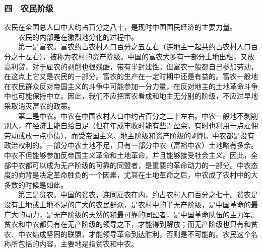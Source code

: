 \documentclass[cn,11pt,chinese]{elegantbook}
\def\myformat#1{\hfil\hfil #1}
\begin{document}
\subsubsection*{\myformat{四　农民阶级}}
农民在全国总人口中大约占百分之八十，是现时中国国民经济的主要力量。\\
　　农民的内部是在激烈地分化的过程中。\\
　　第一是富农。富农约占农村人口百分之五左右（连地主一起共约占农村人口百分之十左右），被称为农村的资产阶级。中国的富农大多有一部分土地出租，又放高利贷，对于雇农的剥削也很残酷，带有半封建性。但富农一般都自己参加劳动，在这点上它又是农民的一部分。富农的生产在一定时期中还是有益的。富农一般地在农民群众反对帝国主义的斗争中可能参加一分力量，在反对地主的土地革命斗争中也可能保持中立。因此，我们不应把富农看成和地主无分别的阶级，不应过早地采取消灭富农的政策。\\
　　第二是中农。中农在中国农村人口中约占百分之二十左右。中农一般地不剥削别人，在经济上能自给自足（但在年成丰收时能有些许盈余，有时也利用一点雇佣劳动或放一点小债），而受帝国主义、地主阶级和资产阶级的剥削。中农都是没有政治权利的。一部分中农土地不足，只有一部分中农（富裕中农）土地略有多余。中农不但能够参加反帝国主义革命和土地革命，并且能够接受社会主义。因此，全部中农都可以成为无产阶级的可靠的同盟者，是重要的革命动力的一部分。中农态度的向背是决定革命胜负的一个因素，尤其在土地革命之后，中农成了农村中的大多数的时候是如此。\\
　　第三是贫农。中国的贫农，连同雇农在内，约占农村人口百分之七十。贫农是没有土地或土地不足的广大的农民群众，是农村中的半无产阶级，是中国革命的最广大的动力，是无产阶级的天然的和最可靠的同盟者，是中国革命队伍的主力军。贫农和中农都只有在无产阶级的领导之下，才能得到解放；而无产阶级也只有和贫农、中农结成坚固的联盟，才能领导革命到达胜利，否则是不可能的。农民这个名称所包括的内容，主要地是指贫农和中农。\\
\end{document}
